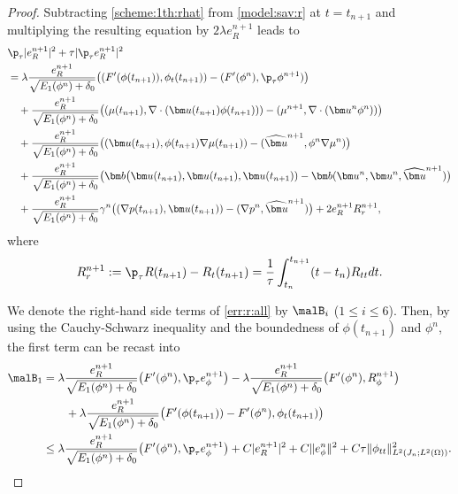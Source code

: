 \begin{proof}
	Subtracting \eqref{scheme:1th:rhat} from \eqref{model:sav:r} at $t=t_{n+1}$ and multiplying the resulting equation by $2 \lambda  e_R^{n+1}$ leads to
	\begin{equation} \label{err:r:all}
		\begin{aligned}
			&	\p_\tau |e_R^{n+1}|^2 + \tau |\p_\tau   e_R^{n+1}|^2 \\
			& =   \lambda \frac{e_R^{n+1}}{\sqrt{E_1(\phi^n)+\delta_0}}\big( (F^{\prime}(\phi(t_{n+1})), \phi_t(t_{n+1})) - (F^{\prime}(\phi^n), \p_\tau   \phi^{n+1})\big) \\
			&\quad  +  \frac{e_R^{n+1}}{\sqrt{E_1(\phi^n)+\delta_0}}\big( (\mu(t_{n+1}), \nabla \cdot (\bm u(t_{n+1}) \phi(t_{n+1}))) - (\mu^{n+1},  \nabla \cdot( \bm u^n \phi^n))\big)\\
			&\quad  +  \frac{e_R^{n+1}}{\sqrt{E_1(\phi^n)+\delta_0}}\big((\bm u(t_{n+1}), \phi(t_{n+1}) \nabla \mu(t_{n+1}))-(\widehat{\bm u}^{n+1}, \phi^n \nabla \mu^n)\big) \\
			&\quad  +  \frac{e_R^{n+1}} {\sqrt{E_1(\phi^n)+\delta_0}}
			\big( \bm b \big(\bm u(t_{n+1}), \bm u(t_{n+1}), \bm u(t_{n+1}))-\bm b(\bm u^n, \bm u^n, \widehat{\bm u}^{n+1})\big) \\
			& \quad + \frac{e_R^{n+1}}
			{\sqrt{E_1(\phi^n)+\delta_0}}\gamma^n \big( (\nabla p(t_{n+1}), \bm u(t_{n+1}))- ( \nabla p^n, \widehat{\bm u}^{n+1})\big)
			+2 e_R^{n+1}  R_r^{n+1}, 
		\end{aligned}
	\end{equation}
	where 
	\begin{equation*} 
		R_r^{n+1}:=\p_\tau R(t_{n+1}) -R_t(t_{n+1})=\frac{1}{\tau} \int_{t_n}^{t_{n+1}}(t-t_n) R_{tt} d t. 
	\end{equation*}
	
	We denote the right-hand side terms of \eqref{err:r:all} by $\malB_i$ ($1\le i \le 6$). Then, by using the Cauchy-Schwarz inequality and the boundedness of $\phi(t_{n+1})$ and $\phi^n$, the first term can be recast into
	\begin{align*} 
		\begin{aligned}
			\malB_1 & = \lambda {\frac{e_R^{n+1}}{\sqrt{E_1(\phi^{n})+\delta_0}} \big(F^{\prime}(\phi^{n}),\p_\tau   e_\phi^{n+1}\big)} - \lambda \frac{e_R^{n+1}}{\sqrt{E_1(\phi^n)+\delta_0}}\big(F^{\prime}(\phi^n), R_\phi^{n+1}\big) \\
			& \qquad + \lambda \frac{e_R^{n+1}}{\sqrt{E_1(\phi^n)+\delta_0}}\big(F^{\prime}(\phi(t_{n+1}))-F^{\prime}(\phi^n), \phi_t(t_{n+1})\big) \\
			&  \leq  \lambda \frac{e_R^{n+1}}{\sqrt{E_1(\phi^{n})+\delta_0}} \big(F^{\prime}(\phi^{n}),\p_\tau   e_\phi^{n+1}\big)+ C|e_R^{n+1}|^2+C\|e_\phi^n\|^2
			+C\tau\|\phi_{tt}\|_{L^2(J_n ; L^2(\Omega))}^2. 
		\end{aligned}
	\end{align*}
	

\end{proof}
